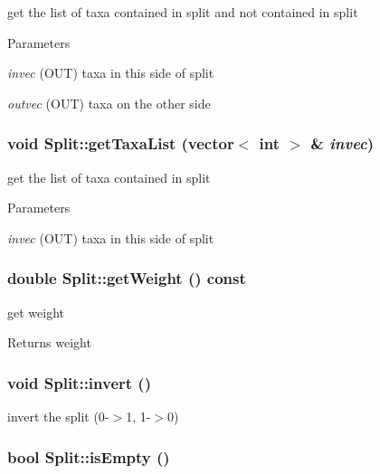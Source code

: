 \label{classSplit_ab8f398ac2532dbeb5697cb2fc4e5ce6b}
get the list of taxa contained in split and not contained in split 
\begin{DoxyParams}{Parameters}
\item[{\em invec}](OUT) taxa in this side of split \item[{\em outvec}](OUT) taxa on the other side \end{DoxyParams}
\hypertarget{classSplit_a6432380add76d5dd97ed106e2d6d10e6}{
\subsubsection[{getTaxaList}]{\setlength{\rightskip}{0pt plus 5cm}void Split::getTaxaList (vector$<$ int $>$ \& {\em invec})}}
\label{classSplit_a6432380add76d5dd97ed106e2d6d10e6}
get the list of taxa contained in split 
\begin{DoxyParams}{Parameters}
\item[{\em invec}](OUT) taxa in this side of split \end{DoxyParams}
\hypertarget{classSplit_a08d9beb4e3b391de5b2aa13c57ea99ca}{
\subsubsection[{getWeight}]{\setlength{\rightskip}{0pt plus 5cm}double Split::getWeight () const}}
\label{classSplit_a08d9beb4e3b391de5b2aa13c57ea99ca}
get weight \begin{DoxyReturn}{Returns}
weight 
\end{DoxyReturn}
\hypertarget{classSplit_aa1c5426a32b64ee0e56e980096a0074c}{
\subsubsection[{invert}]{\setlength{\rightskip}{0pt plus 5cm}void Split::invert ()}}
\label{classSplit_aa1c5426a32b64ee0e56e980096a0074c}
invert the split (0-\/$>$1, 1-\/$>$0) \hypertarget{classSplit_abb9262185c7f5bf5b9f6604c432a796f}{
\subsubsection[{isEmpty}]{\setlength{\rightskip}{0pt plus 5cm}bool Split::isEmpty ()}}
